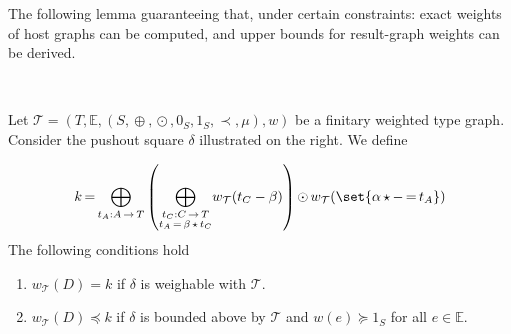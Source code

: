 The following lemma guaranteeing that, under certain constraints: exact weights of host graphs can be computed, and upper bounds for result-graph weights can be derived. 
\begin{lemma}
    \label{lem_4d13}
\ \newline
\begin{minipage}{0.7\textwidth}
    Let $\mathcal{T} \mathop{=} (T,\mathbb{E}, (S, \mathop{\oplus}, \mathop{\odot}, 0_S, 1_S, \prec, \mu), w)$ be a finitary weighted type graph. Consider the pushout square $\delta$ illustrated on the right. We define
\end{minipage}
\begin{minipage}{0.3\textwidth}
    \begin{center}{\normalfont
    }\end{center}
\end{minipage}
     \[k \mathop{=} \underset{t_A:A \mathop{\rightarrow} T}{\mathop{\bigoplus}}
            \left ( 
                \underset{\substack{t_C:C \mathop{\rightarrow} T\\
                                            t_A \mathop{=} \beta \mathop{\star} t_C }}{\mathop{\bigoplus}}
                        w_\mathcal{T}(t_C - \beta)     
                 \right ) 
            \mathop{\odot} 
                w_\mathcal{T}(\set{\alpha \mathop{\star} - \mathop{=} t_A})
    \]
    The following conditions hold
    \begin{enumerate}[label=(\Alph*)]
        \item  $w_\mathcal{T}(D)=k$ if $\delta$ is weighable with $\mathcal{T}$.
        \item  $w_\mathcal{T}(D)\mathop{\preceq} k$ if $\delta$ is bounded above by $\mathcal{T}$  and \(w(e) \mathop{\succeq} 1_S\) for all $e \mathop{\in} \mathbb{E}$.
    \end{enumerate}
\end{lemma}

